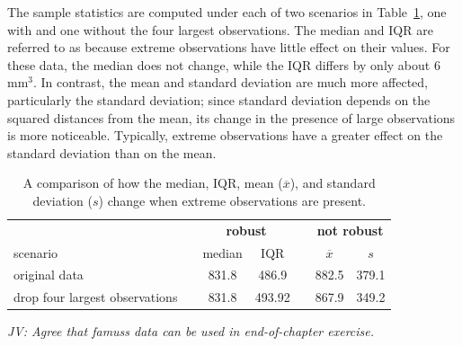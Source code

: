 \begin{doublespace}
The sample statistics are computed under each of two scenarios in Table~\ref{frogRobustOrNotTable}, one with and one without the four largest observations. The median and IQR are referred to as  because extreme observations have little effect on their values. For these data, the median does not change, while the IQR differs by only about 6 $\textrm{mm}^{3}$. In contrast, the mean and standard deviation are much more affected, particularly the standard deviation; since standard deviation depends on the squared distances from the mean, its change in the presence of large observations is more noticeable. Typically, extreme observations have a greater effect on the standard deviation than on the mean.

\begin{table}[ht]
	\centering
	\begin{tabular}{l c cc c cc}
		\hline
		& \hspace{0mm} & \multicolumn{2}{c}{\bf robust} & \hspace{2mm} & \multicolumn{2}{c}{\bf not robust} \\
		scenario && median & IQR && $\overline{x}$ & $s$ \\ 
		\hline
		original \var{frog} data 	&& 831.8 & 486.9 && 882.5 & 379.1 \\
		drop four largest observations && 831.8 & 493.92 && 867.9 & 349.2 \\
		\hline
	\end{tabular}
	\caption{A comparison of how the median, IQR, mean ($\overline{x}$), and standard deviation ($s$) change when extreme observations are present.}
	\label{frogRobustOrNotTable}
\end{table}

\textit{JV: Agree that famuss data can be used in end-of-chapter exercise.}

\end{doublespace}
